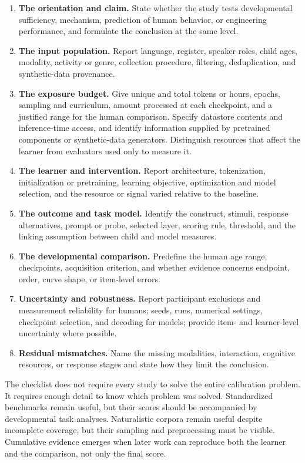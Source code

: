 \begin{enumerate}
  \item \textbf{The orientation and claim.} State whether the study tests developmental sufficiency, mechanism, prediction of human behavior, or engineering performance, and formulate the conclusion at the same level.
  \item \textbf{The input population.} Report language, register, speaker roles, child ages, modality, activity or genre, collection procedure, filtering, deduplication, and synthetic-data provenance.
  \item \textbf{The exposure budget.} Give unique and total tokens or hours, epochs, sampling and curriculum, amount processed at each checkpoint, and a justified range for the human comparison. Specify datastore contents and inference-time access, and identify information supplied by pretrained components or synthetic-data generators. Distinguish resources that affect the learner from evaluators used only to measure it.
  \item \textbf{The learner and intervention.} Report architecture, tokenization, initialization or pretraining, learning objective, optimization and model selection, and the resource or signal varied relative to the baseline.
  \item \textbf{The outcome and task model.} Identify the construct, stimuli, response alternatives, prompt or probe, selected layer, scoring rule, threshold, and the linking assumption between child and model measures.
  \item \textbf{The developmental comparison.} Predefine the human age range, checkpoints, acquisition criterion, and whether evidence concerns endpoint, order, curve shape, or item-level errors.
  \item \textbf{Uncertainty and robustness.} Report participant exclusions and measurement reliability for humans; seeds, runs, numerical settings, checkpoint selection, and decoding for models; provide item- and learner-level uncertainty where possible.
  \item \textbf{Residual mismatches.} Name the missing modalities, interaction, cognitive resources, or response stages and state how they limit the conclusion.
\end{enumerate}

The checklist does not require every study to solve the entire calibration problem. It requires enough detail to know which problem was solved. Standardized benchmarks remain useful, but their scores should be accompanied by developmental task analyses. Naturalistic corpora remain useful despite incomplete coverage, but their sampling and preprocessing must be visible. Cumulative evidence emerges when later work can reproduce both the learner and the comparison, not only the final score.

